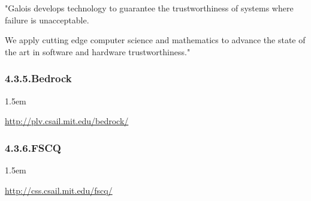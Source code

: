 \documentclass[12pt,twoside]{article}
\begin{document}
\noindent{}"Galois develops technology to guarantee the trustworthiness of
 systems where failure is unacceptable.%

 We apply cutting edge computer science and mathematics to advance the
 state of the art in software and hardware trustworthiness."%

\subsubsection{4.3.5.\hspace*{0.5em}Bedrock}%

\begin{mddefinitions}%


\begin{mdbmarginx}{}{}{}{1.5em}%
\begin{mddefdata}%
\href{http://plv.csail.mit.edu/bedrock/}{{\ttfamily http://\hspace{0pt}plv.\hspace{0pt}csail.\hspace{0pt}mit.\hspace{0pt}edu/\hspace{0pt}bedrock/\hspace{0pt}}}%
\end{mddefdata}%
\end{mdbmarginx}%
\end{mddefinitions}%

\subsubsection{4.3.6.\hspace*{0.5em}FSCQ}%

\begin{mddefinitions}%


\begin{mdbmarginx}{}{}{}{1.5em}%
\begin{mddefdata}%
\href{http://css.csail.mit.edu/fscq/}{{\ttfamily http://\hspace{0pt}css.\hspace{0pt}csail.\hspace{0pt}mit.\hspace{0pt}edu/\hspace{0pt}fscq/\hspace{0pt}}}%
\end{mddefdata}%
\end{mdbmarginx}%
\end{mddefinitions}%
\end{document}

